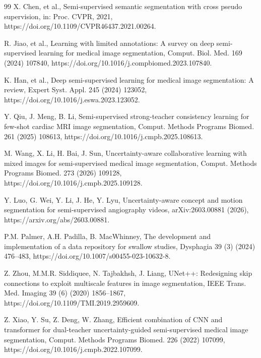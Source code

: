 \documentclass[a4paper,fleqn]{cas-dc}
\begin{document}
\begin{thebibliography}{99}
X. Chen, et al.,
Semi-supervised semantic segmentation with cross pseudo supervision,
in: Proc. CVPR, 2021, https://doi.org/10.1109/CVPR46437.2021.00264.

R. Jiao, et al.,
Learning with limited annotations: A survey on deep semi-supervised learning for medical image segmentation,
Comput. Biol. Med. 169 (2024) 107840, https://doi.org/10.1016/j.compbiomed.2023.107840.

K. Han, et al.,
Deep semi-supervised learning for medical image segmentation: A review,
Expert Syst. Appl. 245 (2024) 123052, https://doi.org/10.1016/j.eswa.2023.123052.

Y. Qiu, J. Meng, B. Li,
Semi-supervised strong-teacher consistency learning for few-shot cardiac MRI image segmentation,
Comput. Methods Programs Biomed. 261 (2025) 108613, https://doi.org/10.1016/j.cmpb.2025.108613.

M. Wang, X. Li, H. Bai, J. Sun,
Uncertainty-aware collaborative learning with mixed images for semi-supervised medical image segmentation,
Comput. Methods Programs Biomed. 273 (2026) 109128, https://doi.org/10.1016/j.cmpb.2025.109128.

Y. Luo, G. Wei, Y. Li, J. He, Y. Lyu,
Uncertainty-aware concept and motion segmentation for semi-supervised angiography videos,
arXiv:2603.00881 (2026), https://arxiv.org/abs/2603.00881.

P.M. Palmer, A.H. Padilla, B. MacWhinney,
The development and implementation of a data repository for swallow studies,
Dysphagia 39 (3) (2024) 476--483, https://doi.org/10.1007/s00455-023-10632-8.

Z. Zhou, M.M.R. Siddiquee, N. Tajbakhsh, J. Liang,
UNet++: Redesigning skip connections to exploit multiscale features in image segmentation,
IEEE Trans. Med. Imaging 39 (6) (2020) 1856--1867, https://doi.org/10.1109/TMI.2019.2959609.

Z. Xiao, Y. Su, Z. Deng, W. Zhang,
Efficient combination of CNN and transformer for dual-teacher 
uncertainty-guided semi-supervised medical image segmentation,
Comput. Methods Programs Biomed. 226 (2022) 107099, https://doi.org/10.1016/j.cmpb.2022.107099.


\end{thebibliography}
\end{document}
